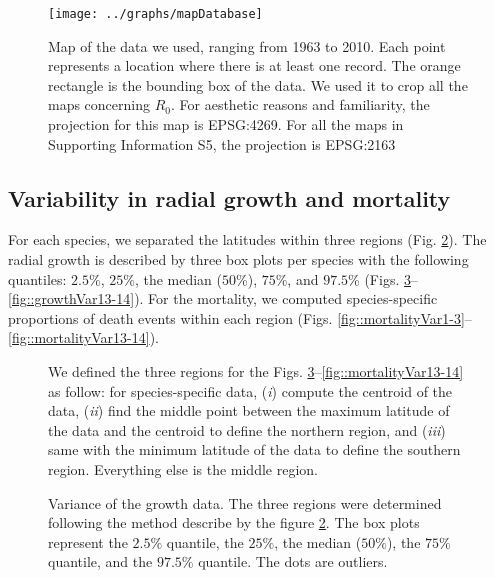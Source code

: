 \documentclass[letterpaper, 12pt]{article}
\theoremstyle{theo}
\begin{document}
\begin{refsection}
\begin{onehalfspace}
\begin{figure}[htb]
    \centering
	\texttt{[image: ../graphs/mapDatabase]}
	\caption[Map database and cropping box]{Map of the data we used, ranging from 1963 to 2010. Each point represents a location where there is at least one record. The orange rectangle is the bounding box of the data. We used it to crop all the maps concerning $ R_0 $. For aesthetic reasons and familiarity, the projection for this map is EPSG:4269. For all the maps in Supporting Information S5, the projection is EPSG:2163}
\label{fig::mapDatabase}
\end{figure}

\clearpage
\subsection{Variability in radial growth and mortality}
For each species, we separated the latitudes within three regions (Fig. \ref{fig::defineRegion}). The radial growth is described by three box plots per species with the following quantiles: $ 2.5 \% $, $ 25 \% $, the median ($ 50 \% $), $ 75 \% $, and $ 97.5 \% $ (Figs. \ref{fig::growthVar1-3}--\ref{fig::growthVar13-14}). For the mortality, we computed species-specific proportions of death events within each region (Figs. \ref{fig::mortalityVar1-3}--\ref{fig::mortalityVar13-14}).

\begin{figure}
	\centering
	
	\caption[Definition 3 regions]{We defined the three regions for the Figs. \ref{fig::growthVar1-3}--\ref{fig::mortalityVar13-14} as follow: for species-specific data, (\textit{i}) compute the centroid of the data, (\textit{ii}) find the middle point between the maximum latitude of the data and the centroid to define the northern region, and (\textit{iii}) same with the minimum latitude of the data to define the southern region. Everything else is the middle region. \label{fig::defineRegion}}
\end{figure}

\begin{figure}
	\centering
	
	\caption[Growth variation, species 1--3]{Variance of the growth data. The three regions were determined following the method describe by the figure \ref{fig::defineRegion}. The box plots represent the $ 2.5 \%$ quantile, the $ 25 \% $, the median ($ 50 \% $), the $ 75 \% $ quantile, and the $ 97.5 \% $ quantile. The dots are outliers. \label{fig::growthVar1-3}}
\end{figure}


\end{onehalfspace}
\end{refsection}
\end{document}
